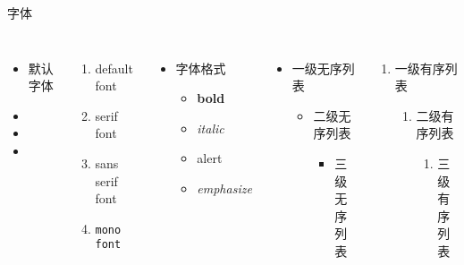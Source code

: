 
    \begin{frame}{字体}
        \justifying
        
        \begin{columns}
            \centering
            \begin{itemize}
                \item 默认字体
                \item {}
                \item {}
                \item {}
            \end{itemize}
            \begin{enumerate}
                \item default font
                \item \textrm{serif font}
                \item \textsf{sans serif font}
                \item \texttt{mono font}
            \end{enumerate}  
            \begin{itemize}
                \item 字体格式
                \begin{itemize}
                    \item \textbf{bold}
                    \item \textit{italic}
                    \item \alert{alert}
                    \item \emph{emphasize}
                \end{itemize}
            \end{itemize}
            \begin{itemize}
                \item 一级无序列表
                \begin{itemize}
                    \item 二级无序列表
                    \begin{itemize}
                        \item 三级无序列表
                    \end{itemize}
                \end{itemize}
            \end{itemize}
            \begin{enumerate}
                \item 一级有序列表
                \begin{enumerate}
                    \item 二级有序列表
                    \begin{enumerate}
                        \item 三级有序列表
                    \end{enumerate}
                \end{enumerate}
            \end{enumerate}
        \end{columns}
          

\end{frame}
